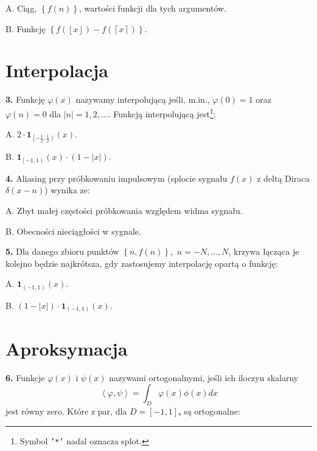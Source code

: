 \documentclass[journal,9pt,final,a4paper]{IEEEtran}%
\providecommand{\U}[1]{\protect\rule{.1in}{.1in}}
\begin{document}
A. Ciąg, $\left\{  f\left(  n\right)  \right\}  $, wartości funkcji
dla tych argumentów.

B. Funkcję $\left\{  f\left(  \left\lfloor x\right\rfloor \right)
-f\left(  \left\lceil x\right\rceil \right)  \right\}  $.

\section{Interpolacja}

\textbf{3. }Funkcję $\varphi\left(  x\right)  $ nazywamy
interpolującą jeśli, m.in., $\varphi\left(  0\right)  =1$ oraz
$\varphi\left(  n\right)  =0$ dla $\left\vert n\right\vert =1,2,\ldots$.
Funkcją interpolującą jest\footnote{Symbol \texttt{'*'} nadal
oznacza splot.}:

A. $2\cdot\mathbf{1}_{\left[  -%
\frac12
,%
\frac12
\right)  }\left(  x\right)  .$

B. $\mathbf{1}_{\left[  -1,1\right)  }\left(  x\right)  \cdot\left(
1-\left\vert x\right\vert \right)  .$

\vspace*{0.25in}\textbf{4. }Aliasing przy próbkowaniu impulsowym (splocie
sygnału $f\left(  x\right)  $ z deltą Diraca $\delta\left(  x-n\right)  $)
wynika ze:

A. Zbyt małej częstości próbkowania względem widma sygnału.

B. Obecności nieciągłości w sygnale.

\vspace*{0.25in}\textbf{5. }Dla danego zbioru punktów $\left\{  n,f\left(
n\right)  \right\}  ,$ $n=-N,\ldots,N$, krzywa łącząca je kolejno
będzie najkrótsza, gdy zastosujemy interpolację opartą o funkcję:

A. $\mathbf{1}_{\left(  -1,1\right)  }\left(  x\right)  .$

B. $\left(  1-\left\vert x\right\vert \right)  \cdot\mathbf{1}_{\left(
-1,1\right)  }\left(  x\right)  .$

\section{Aproksymacja}

\textbf{6. }Funkcje $\varphi\left(  x\right)  $ i $\psi\left(  x\right)  $
nazywami ortogonalnymi, jeśli ich iloczyn skalarny%
\[
\left\langle \varphi,\psi\right\rangle =\int_{D}\varphi\left(  x\right)
\phi\left(  x\right)  dx
\]
jest równy zero. Które z par, dla $D=\left[  -1,1\right]  $\textbf{,}
są ortogonalne:
\end{document}
